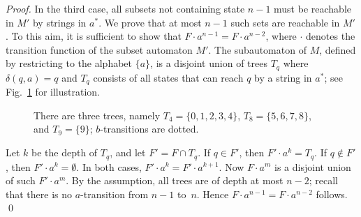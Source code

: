 \documentclass[runningheads]{llncs}
\begin{document}
\begin{proof}
    In the third case, all subsets not containing state $n-1$  
    must be reachable in $M'$ 
    by strings in $a^*$. 
    We prove that at most $n-1$ such sets are reachable in $M'$.
    To this aim, it is sufficient to show that $F\cdot a^{n-1} = F\cdot a^{n-2}$,
    where $\cdot$ denotes the transition function of the subset automaton $M'$.
    The subautomaton of $M$, defined by restricting to the alphabet $\{a\}$,
    is a disjoint union of trees $T_q$ where $\delta(q,a)=q$ and $T_q$
    consists of all states that can reach $q$ by a string in $a^*$;
    see Fig.~\ref{fig:trees} for illustration.
    \begin{figure}[t]
      \centering
      \caption{There are three trees, namely $T_4=\{0,1,2,3,4\}$, $T_8=\{5,6,7,8\}$, and $T_9=\{9\}$; $b$-transitions are dotted.}
      \label{fig:trees}
    \end{figure}
    Let $k$ be the depth of $T_q$, and let $F' = F\cap T_q$.
    If $q \in F'$, then $F'\cdot a^{k} =T_q$. 
    If $q \notin F'$, then $F'\cdot  a^{k}=\emptyset$.
    In both cases, $F'\cdot a^{k} =F'\cdot a^{k+1}$.
    Now $F \cdot a^m$ is a disjoint union of such $F'\cdot a^m$. 
    By the assumption, all trees are of depth at most $n-2$;
    recall that there is no $a$-transition from $n-1$ to~$n$.
    Hence $ F\cdot a^{n-1} =F\cdot a^{n-2}$ follows.
  \qed
  \end{proof}
\end{document}
